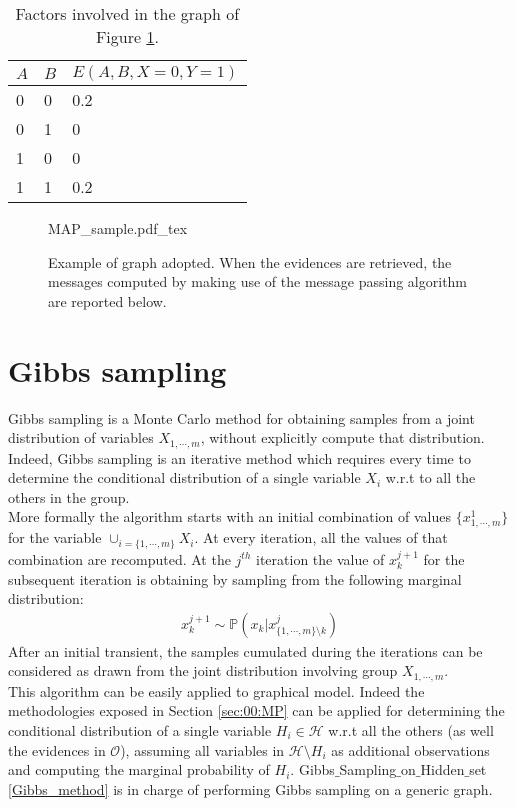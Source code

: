 \begin{table}[]
\centering
\begin{tabular}{|l|l|l|}
$A$ & $B$ & $E(A,B,X=0,Y=1)$ \\
\hline
0 & 0 & 0.2 \\
\hline
0 & 1 & 0 \\
\hline
1 & 0 & 0 \\
\hline
1 & 1 & 0.2 \\
\hline
\end{tabular}
\caption{Factors involved in the graph of Figure \ref{fig:00:MAP_sample}.} 
\label{tab:00:t4}
\end{table}

\begin{figure}
	\centering
\def\svgwidth{0.8 \textwidth}
{MAP_sample.pdf_tex}
	\caption{Example of graph adopted. When the evidences are retrieved, the messages computed by making use of the message passing algorithm are reported below.}
	\label{fig:00:MAP_sample}
\end{figure}  

\section{Gibbs sampling}
\label{sec:00:GIBBS}

Gibbs sampling is a Monte Carlo method for obtaining samples from a joint distribution of variables $X_{1,\cdots,m}$, without explicitly compute that distribution. Indeed, Gibbs sampling is an iterative method which requires every time to determine the conditional distribution of a single variable $X_i$ w.r.t to all the others in the group. 
\\
More formally the algorithm starts with an initial combination of values $\lbrace x^1_{1,\cdots,m} \rbrace$ for the variable 
$ \cup _{i = \lbrace 1,\cdots,m \rbrace } X_i$. At every iteration, all the values of that combination are recomputed. At the $j^{th}$ iteration the value of $x^{j+1} _k$ for the subsequent iteration is obtaining by sampling from the following marginal distribution:
\begin{eqnarray}
x^{j+1} _k \sim \mathbb{P}(x _{k} | x^j_{\lbrace 1, \cdots , m \rbrace \setminus k } )
\end{eqnarray}
After an initial transient, the samples cumulated during the iterations can be considered as drawn from the joint distribution involving group $X_{1,\cdots,m}$. 
\\ 
This algorithm can be easily applied to graphical model. Indeed the methodologies exposed in Section \ref{sec:00:MP} can be applied for determining the conditional distribution of a single variable $H_i \in \mathcal{H}$ w.r.t all the others (as well the evidences in $\mathcal{O}$), assuming all variables in $\mathcal{H} \setminus H_i$ as additional observations and computing the marginal probability of $H_i$.
Gibbs$\_$Sampling$\_$on$\_$Hidden$\_$set \ref{Gibbs_method} is in charge of performing Gibbs sampling on a generic graph.

